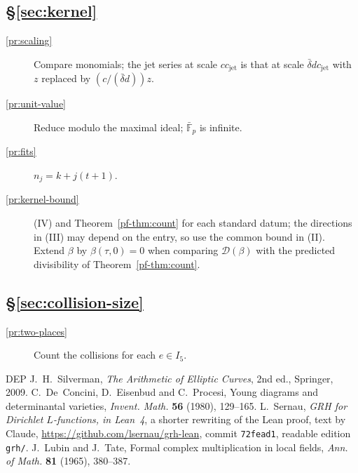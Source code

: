 \documentclass[reqno]{amsart}
\theoremstyle{plain}
\theoremstyle{definition}
\theoremstyle{remark}
\newcommand{\Dc}{\mathcal D}
\newcommand{\cjet}{c_{\mathrm{jet}}}
\begin{document}
\subsection*{\S\ref{sec:kernel}}
\begin{description}
\item[\ref{pr:scaling}] Compare monomials; the jet series at scale \(c\cjet\) is that at scale \(\bar\delta d \cjet\) with \(z\) replaced by \((c/(\bar\delta d)) z\).
\item[\ref{pr:unit-value}] Reduce modulo the maximal ideal; \(\bar{\mathbb F}_p\) is infinite.
\item[\ref{pr:fits}] \(n_j = k + j(t+1)\).
\item[\ref{pr:kernel-bound}] (IV) and Theorem~\ref{pf-thm:count} for each standard datum; the directions in (III) may depend on the entry, so use the common bound in (II).  Extend \(\beta\) by \(\beta(\tau, 0) = 0\) when comparing \(\Dc(\beta)\) with the predicted divisibility of Theorem~\ref{pf-thm:count}.
\end{description}

\subsection*{\S\ref{sec:collision-size}}
\begin{description}
\item[\ref{pr:two-places}] Count the collisions for each \(e \in I_5\).
\end{description}

\begin{thebibliography}{DEP}
 J.~H.~Silverman, \emph{The Arithmetic of Elliptic Curves}, 2nd ed., Springer, 2009.
 C.~De~Concini, D.~Eisenbud and C.~Procesi, Young diagrams and determinantal varieties, \emph{Invent. Math.} \textbf{56} (1980), 129--165.
 L.~Sernau, \emph{GRH for Dirichlet \(L\)-functions, in Lean~4}, a shorter rewriting of the Lean proof, text by Claude, \url{https://github.com/lsernau/grh-lean}, commit \texttt{72fead1}, readable edition \texttt{grh/}.
 J.~Lubin and J.~Tate, Formal complex multiplication in local fields, \emph{Ann. of Math.} \textbf{81} (1965), 380--387.
\end{thebibliography}
\end{document}
